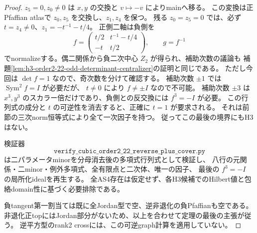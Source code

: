 \begin{proof}
$z_5=0,z_0\ne0$ は $x,y$ の交換と $v\mapsto-v$ によりmainへ移る。
この変換は正Pfaffian atlasで $z_0,z_5$ を交換し、$z_1,z_4$ を保つ。
残る $z_0=z_5=0$ では、必ず $t=z_4\ne0$、$z_1=-t^{-1}-t/4$。
正側二軸は負側を
\[
 f=\begin{pmatrix}t/2&t^{-1}-t/4\\-t&t/2\end{pmatrix},\qquad g=f^{-1}
\]
でnormalizeする。偶二関係から負二次中心 $Z_2$ が得られ、補助次数の議論も
補題\ref{lem:h3-order2-22-odd-determinant-centralizer}の証明と同じである。
ただし今回は $\det f=1$ なので、奇次数を分けて確認する。
補助次数 $\pm1$ では $\operatorname{Sym}^2 f=I$ が必要だが、
$t\ne0$ により $f\ne\pm I$ なので不可能。
補助次数 $\pm3$ は $x^3,y^3$ のスカラー倍だけであり、負側との反交換には $f^3=-I$ が必要。
この行列式の成分と $t$ の可逆性を消去すると、正確に $t=1$ が要求される。
それは前節の三次norm恒等式により全て一次因子を持つ。
従ってこの最後の境界にもH3はない。

検証器
\[
\texttt{verify\_cubic\_order2\_22\_reverse\_plus\_cover.py}
\]
は二パラメータminorを分母消去後の多項式行列式として検証し、
八行の元関係・二minor・例外多項式、全有限点と二次体、唯一の因子、
最後の $f^3=-I$ の局所化idealを再生する。
全AS4存在は仮定せず、各H3候補でのHilbert値と包絡domain性に基づく必要排除である。

負tangent第一割当ては既に全Jordan型で空、逆非退化の負Pfaffianも空である。
非退化正topにはJordan部分がないため、以上を合わせて定理の最後の主張が従う。
逆平方型のrank2 crossには、この可逆graph計算を適用していない。
\end{proof}
